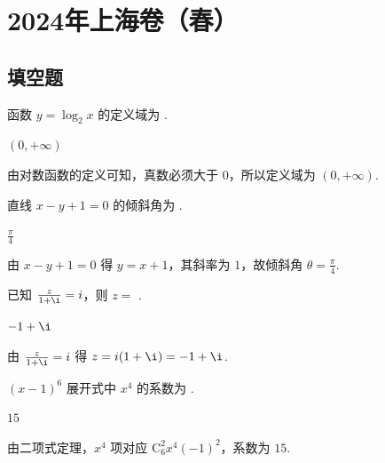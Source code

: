 \chapter{2024年上海卷（春）}

\section{填空题}

\begin{problem}
函数 \(y=\log_2 x\) 的定义域为\fillinblank{} .
\end{problem}

\begin{answer}
\(\left(0,+\infty\right)\)
\end{answer}

\begin{solution}
由对数函数的定义可知，真数必须大于 \(0\)，所以定义域为 \(\left(0,+\infty\right)\).
\end{solution}

\begin{problem}
直线 \(x-y+1=0\) 的倾斜角为\fillinblank{} .
\end{problem}

\begin{answer}
\(\frac{\pi}{4}\)
\end{answer}

\begin{solution}
由 \(x-y+1=0\) 得 \(y=x+1\)，其斜率为 \(1\)，故倾斜角 \(\theta=\frac{\pi}{4}\).
\end{solution}

\begin{problem}
已知 \(\frac{z}{1+\i}=i\)，则 \(z=\)\fillinblank{} .
\end{problem}

\begin{answer}
\(-1+\i\)
\end{answer}

\begin{solution}
由 \(\frac{z}{1+\i}=i\) 得 \(z=i(1+\i)=-1+\i\).
\end{solution}

\begin{problem}
\(\left(x-1\right)^6\) 展开式中 \(x^4\) 的系数为\fillinblank{} .
\end{problem}

\begin{answer}
\(15\)
\end{answer}

\begin{solution}
由二项式定理，\(x^4\) 项对应 \(\mathrm C_6^2 x^4(-1)^2\)，系数为 \(15\).
\end{solution}

